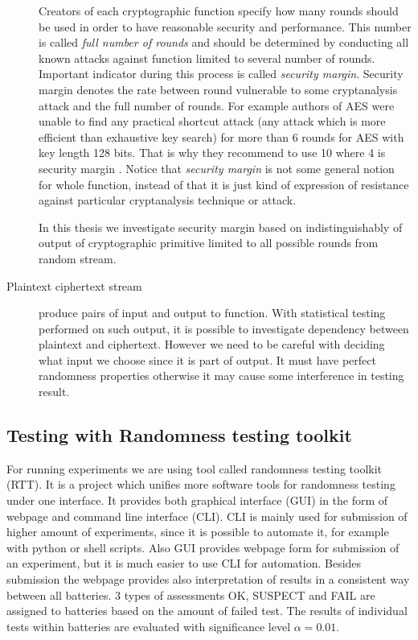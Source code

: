 \documentclass[
    digital,    %
    oneside,    %
    color,
    11pt,
    nocover,
    notable,
    nolof,
    nolot,
    final
]{fithesis3}
\begin{document}
\begin{description}
	Creators of each cryptographic function specify how many rounds should be used in order to have reasonable security and performance. This number is called \textit{full number of rounds} and should be determined by conducting all known attacks against function limited to several number of rounds. Important indicator during this process is called \textit{security margin}. Security margin denotes the rate between round vulnerable to some cryptanalysis attack and the full number of rounds. For example authors of AES were unable to find any practical shortcut attack (any attack which is more efficient than exhaustive key search) for more than 6 rounds for AES with key length 128 bits. That is why they recommend to use 10 where 4 is security margin \cite{daemen1999aes}. Notice that \textit{security margin} is not some general notion for whole function, instead of that it is just kind of expression of resistance against particular cryptanalysis technique or attack.
	
	In this thesis we investigate security margin based on indistinguishably of output of cryptographic primitive limited to all possible rounds from random stream.
	
	\item[Plaintext ciphertext stream] produce pairs of input and output to function. With statistical testing performed on such output, it is possible to investigate dependency between plaintext and ciphertext. However we need to be careful with deciding what input we choose since it is part of output. It must have perfect randomness properties otherwise it may cause some interference in testing result.

\end{description}

\subsection{Testing with Randomness testing toolkit}

For running experiments we are using tool called randomness testing toolkit (RTT). It is a project which unifies more software tools for randomness testing under one interface. It provides both graphical interface (GUI) in the form of webpage and command line interface (CLI). CLI is mainly used for submission of higher amount of experiments, since it is possible to automate it, for example with python or shell scripts. Also GUI provides webpage form for submission of an experiment, but it is much easier to use CLI for automation. Besides submission the webpage provides also interpretation of results in a consistent way between all batteries. 3 types of assessments OK, SUSPECT and FAIL are assigned to batteries based on the amount of failed test. The results of individual tests within batteries are evaluated with significance level $\alpha = 0.01$.
\end{document}
